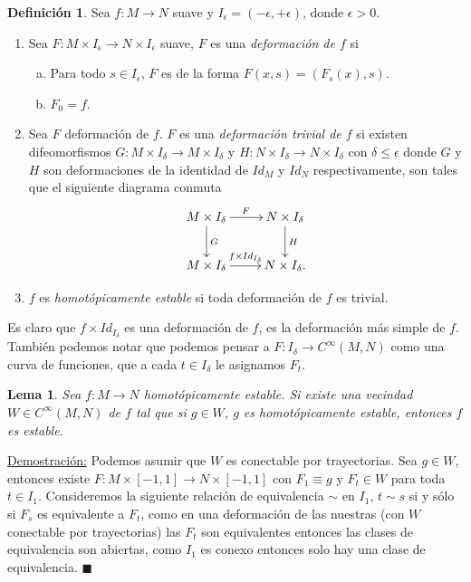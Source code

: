 \documentclass{report}
\newtheorem{lem}[theorem]{Lema}
\theoremstyle{definition}
\newtheorem{defi}[theorem]{Definici\'on}
\begin{document}
\begin{defi}
Sea $f:M \to N$ suave y $I_\epsilon = (- \epsilon , + \epsilon)$, donde $\epsilon > 0$.
\begin{enumerate}
\item Sea $F: M \times I_\epsilon \to N \times I_\epsilon$ suave, $F$ es una \textit{deformaci\'on de $f$} si 
\begin{enumerate}[a.]
\item Para todo $s \in I_\epsilon$, $F$ es de la forma $F(x,s) = (F_s (x) , s)$.
\item $F_0 = f$.
\end{enumerate}
\item Sea $F$ deformaci\'on de $f$. $F$ es una \textit{deformaci\'on trivial de $f$} si existen difeomorfismos $G: M \times I_\delta \to M \times I_\delta$ y $H: N \times I_\delta \to N \times I_\delta$ con $\delta \leq \epsilon$ donde $G$ y $H$ son deformaciones de la identidad de $Id_M$ y $Id_N$ respectivamente, son tales que el siguiente diagrama conmuta
$$\xymatrix{
M \times I_\delta \ar[d]^G \ar[r]^F & N \times I_\delta \ar[d]^H\\
M \times I_\delta \ar[r]^{f \times Id_{I_\delta}} &N \times I_\delta .}$$
\item $f$ es \textit{homot\'opicamente estable} si toda deformaci\'on de $f$ es trivial.


\end{enumerate} 
\end{defi}

Es claro que $f \times Id_{I_\delta}$ es una deformaci\'on de $f$, es la deformaci\'on m\'as simple de $f$. Tambi\'en podemos notar que podemos pensar a $F: I_\delta \to C^\infty (M,N)$ como una curva de funciones, que a cada $t \in I_\delta$ le asignamos $F_t$.

\begin{lem}
Sea $f:M \to N$ homot\'opicamente estable. Si existe una vecindad $W \in C^\infty (M,N)$ de $f$ tal que si $g \in W$, $g$ es homot\'opicamente estable, entonces $f$ es estable.
\end{lem}
 
\underline{Demostraci\'on:} Podemos asumir que $W$ es conectable por trayectorias. Sea $g \in W$, entonces existe $F: M \times [-1 , 1] \to N \times [-1,1]$ con $F_1 \equiv g$ y $F_t \in W$ para toda $t \in I_1$. Consideremos la siguiente relaci\'on de equivalencia $\sim$ en $I_1$, $t \sim s$ si y s\'olo si $F_s$ es equivalente a $F_t$, como en una deformaci\'on de las nuestras (con $W$ conectable por trayectorias) las $F_t$ son equivalentes entonces las clases de equivalencia son abiertas, como $I_1$ es conexo entonces solo hay una clase de equivalencia. $\blacksquare$
\end{document}
